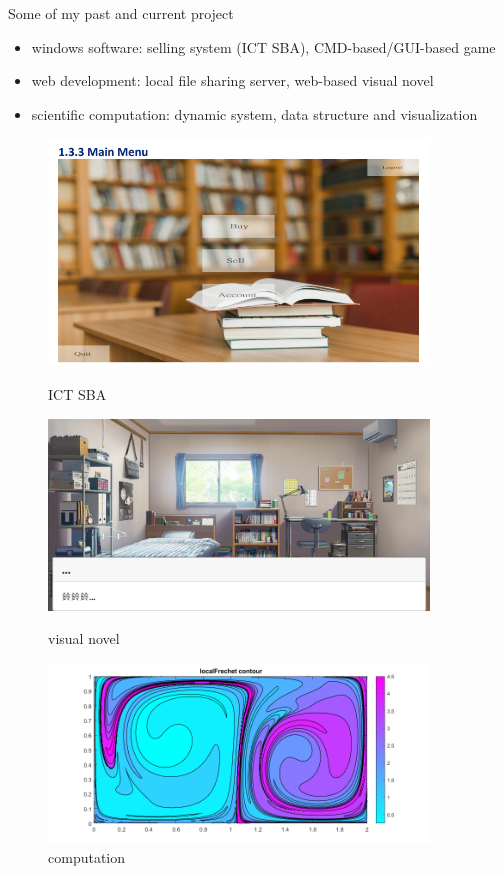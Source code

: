 \documentclass[10pt,xcolor={table,dvipsnames},t]{beamer}
\begin{document}
\begin{frame}{Some of my past and current project}
  \begin{itemize}
    \item windows software: selling system (ICT SBA), CMD-based/GUI-based game 
    \item web development: local file sharing server, web-based visual novel
    \item scientific computation: dynamic system, data structure and visualization
  \end{itemize}
  \begin{figure}[h!]
    \centering
    \begin{minipage}{0.3\textwidth}
        \centering
        \includegraphics[width=0.9\textwidth]{proj1.png}
        \caption{ICT SBA}
    \end{minipage}\hfill
    \begin{minipage}{0.3\textwidth}
        \centering
        \includegraphics[width=0.9\textwidth]{proj2.png}
        \caption{visual novel}
    \end{minipage}\hfill
    \begin{minipage}{0.3\textwidth}
        \centering
        \includegraphics[width=0.9\textwidth]{proj3.png}
        \caption{computation}
    \end{minipage}
  \end{figure}
\end{frame}
\end{document}
